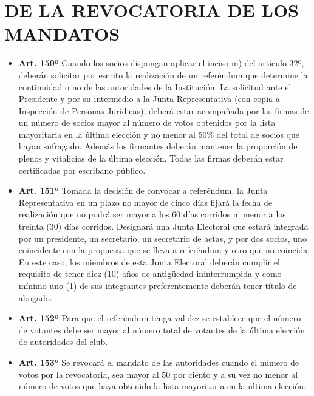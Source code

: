 \documentclass[]{book}
\providecommand{\tightlist}{%
  \setlength{\itemsep}{0pt}\setlength{\parskip}{0pt}}
\begin{document}
\chapter{DE LA REVOCATORIA DE LOS MANDATOS}\label{cap25}

\begin{itemize}
\tightlist
\item
  \textbf{Art. 150º} Cuando los socios dispongan aplicar el inciso m)
  del \protect\hyperlink{art32}{artículo 32º}, deberán solicitar por
  escrito la realización de un referéndum que determine la continuidad o
  no de las autoridades de la Institución. La solicitud ante el
  Presidente y por su intermedio a la Junta Representativa (con copia a
  Inspección de Personas Jurídicas), deberá estar acompañada por las
  firmas de un número de socios mayor al número de votos obtenidos por
  la lista mayoritaria en la última elección y no menor al 50\% del
  total de socios que hayan sufragado. Además los firmantes deberán
  mantener la proporción de plenos y vitalicios de la última elección.
  Todas las firmas deberán estar certificadas por escribano público.
\end{itemize}

\begin{itemize}
\tightlist
\item
  \textbf{Art. 151º} Tomada la decisión de convocar a referéndum, la
  Junta Representativa en un plazo no mayor de cinco días fijará la
  fecha de realización que no podrá ser mayor a los 60 días corridos ni
  menor a los treinta (30) días corridos. Designará una Junta Electoral
  que estará integrada por un presidente, un secretario, un secretario
  de actas, y por dos socios, uno coincidente con la propuesta que se
  lleva a referéndum y otro que no coincida. En este caso, los miembros
  de esta Junta Electoral deberán cumplir el requisito de tener diez
  (10) años de antigüedad ininterrumpida y como mínimo uno (1) de sus
  integrantes preferentemente deberán tener título de abogado.
\end{itemize}

\begin{itemize}
\tightlist
\item
  \textbf{Art. 152º} Para que el referéndum tenga validez se establece
  que el número de votantes debe ser mayor al número total de votantes
  de la última elección de autoridades del club.
\end{itemize}

\begin{itemize}
\tightlist
\item
  \textbf{Art. 153º} Se revocará el mandato de las autoridades cuando el
  número de votos por la revocatoria, sea mayor al 50 por ciento y a su
  vez no menor al número de votos que haya obtenido la lista mayoritaria
  en la última elección.
\end{itemize}
\end{document}
